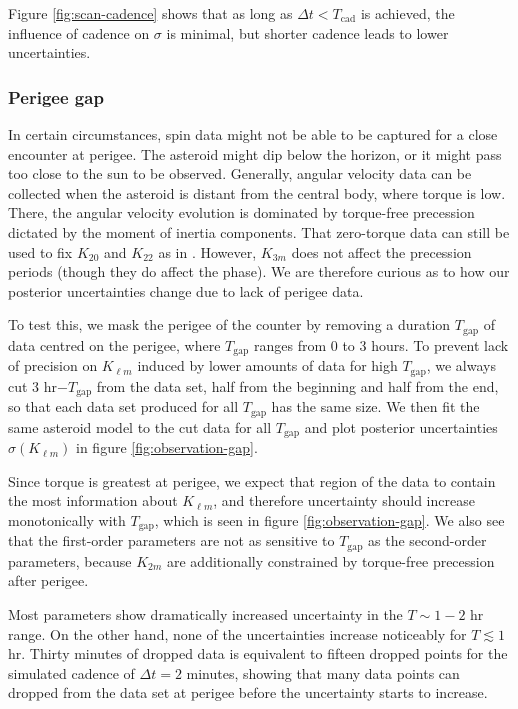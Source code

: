 \documentclass[fleqn,usenatbib]{mnras}
\begin{document}
Figure \ref{fig:scan-cadence} shows that as long as $\Delta t < T_\text{cad}$ is achieved, the influence of cadence on $\sigma$ is minimal, but shorter cadence leads to lower uncertainties.



\subsubsection{Perigee gap}
\label{sec:scan-gap}
In certain circumstances, spin data might not be able to be captured for a close encounter at perigee. The asteroid might dip below the horizon, or it might pass too close to the sun to be observed. Generally, angular velocity data can be collected when the asteroid is distant from the central body, where torque is low. There, the angular velocity evolution is dominated by torque-free precession dictated by the moment of inertia components. That zero-torque data can still be used to fix $K_{20}$ and $K_{22}$ as in \cite{MOSKOVITZ2020113519}. However, $K_{3m}$ does not affect the precession periods (though they do affect the phase). We are therefore curious as to how our posterior uncertainties change due to lack of perigee data.

To test this, we mask the perigee of the counter by removing a duration $T_\text{gap}$ of data centred on the perigee, where $T_\text{gap}$ ranges from 0 to 3 hours. To prevent lack of precision on $K_{\ell m}$ induced by lower amounts of data for high $T_\text{gap}$, we always cut 3 hr$-T_\text{gap}$ from the data set, half from the beginning and half from the end, so that each data set produced for all $T_\text{gap}$ has the same size. We then fit the same asteroid model to the cut data for all $T_\text{gap}$ and plot posterior uncertainties $\sigma(K_{\ell m})$ in figure \ref{fig:observation-gap}.

Since torque is greatest at perigee, we expect that region of the data to contain the most information about $K_{\ell m}$, and therefore uncertainty should increase monotonically with $T_\text{gap}$, which is seen in figure \ref{fig:observation-gap}. We also see that the first-order parameters are not as sensitive to $T_\text{gap}$ as the second-order parameters, because $K_{2m}$ are additionally constrained by torque-free precession after perigee.

Most parameters show dramatically increased uncertainty in the $T \sim 1-2$ hr range. On the other hand, none of the uncertainties increase noticeably for $T \lesssim 1$ hr. Thirty minutes of dropped data is equivalent to fifteen dropped points for the simulated cadence of $\Delta t = 2$ minutes, showing that many data points can dropped from the data set at perigee before the uncertainty starts to increase.
\end{document}
